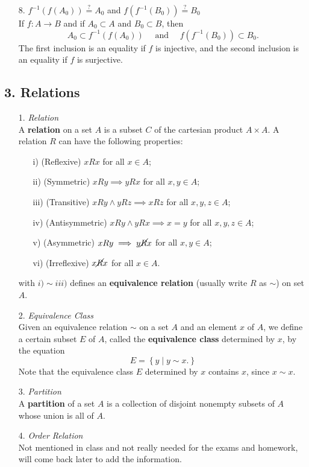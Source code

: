 \begin{enumerate}
    \item[8.] $f^{-1}\left(f(A_0)\right)\stackrel{?}{=} A_0$ and $f\left(f^{-1}(B_0)\right)\stackrel{?}{=} B_0$\\
        If $f: A \longrightarrow B$ and if $A_0 \subset A$ and $B_0 \subset B$, then
        $$A_0 \subset f^{-1}\left(f(A_0)\right) \,\,\,\,\,\,\text{ and } \,\,\,\,\,\, f\left(f^{-1}(B_0)\right) \subset B_0.$$
        The first inclusion is an equality if $f$ is injective, and the second inclusion is an equality if $f$ is surjective.
\end{enumerate}

\subsection*{3. Relations}

\begin{enumerate}
    \item[1.] \emph{Relation}\\
    A {\bf relation} on a set $A$ is a subset $C$ of the cartesian product $A \times A$. A relation $R$ can have the following properties:
        \begin{enumerate}
            \item[i)] (Reflexive) $xRx$ for all $x \in A$;
            \item[ii)] (Symmetric) $xRy \implies yRx$ for all $x, y \in A$;
            \item[iii)] (Transitive) $xRy \land yRz \implies xRz$ for all $x, y, z \in A$;
            \item[iv)] (Antisymmetric) $xRy \land yRx \implies x = y$ for all $x, y, z \in A$;
            \item[v)] (Asymmetric) $xRy \implies y\cancel{R}x$ for all $x, y \in A$;
            \item[vi)] (Irreflexive) $x\cancel{R}x$ for all $x \in A$.
        \end{enumerate}
    with $i) \sim iii)$ defines an {\bf equivalence relation} (usually write $R$ as $\sim$) on set $A$.
    \item[2.] \emph{Equivalence Class}\\
    Given an equivalence relation $\sim$ on a set $A$ and an element $x$ of $A$, we define a certain subset $E$ of $A$, called the {\bf equivalence class} determined by $x$, by the equation 
        $$E = \left\{y \mid y \sim x.\right\}$$
        Note that the equivalence class $E$ determined by $x$ contains $x$, since $x \sim x$.
    \item[3.] \emph{Partition}\\
    A {\bf partition} of a set $A$ is a collection of disjoint nonempty subsets of $A$ whose union is all of $A$.
    \item[4.] \emph{Order Relation}\\
    Not mentioned in class and not really needed for the exams and homework, will come back later to add the information.
\end{enumerate}
